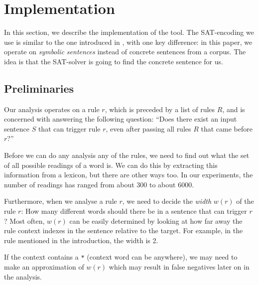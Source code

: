\section{Implementation}
\label{sec:implementation}

In this section, we describe the implementation of the tool.
The SAT-encoding we use is similar to the one introduced in , with one key difference: in this paper, we operate on {\em symbolic sentences} instead of concrete sentences from a corpus. The idea is that the SAT-solver is going to find the concrete sentence for us.

\subsection{Preliminaries}

Our analysis operates on a rule $r$, which is preceded by a list of rules $R$, and is concerned with answering the following question: ``Does there exist an input sentence $S$ that can trigger rule $r$, even after passing all rules $R$ that came before $r$?''

Before we can do any analysis any of the rules, we need to find out what the set of all possible readings of a word is. We can do this by extracting this information from a lexicon, but there are other ways too. In our experiments, the number of readings has ranged from about 300 to about 6000. 

Furthermore, when we analyse a rule $r$, we need to decide the {\em width} $w(r)$ of the rule $r$: How many different words should there be in a sentence that can trigger $r$? Most often, $w(r)$ can be easily determined by looking at how far away the rule context indexes in the sentence relative to the target. For example, in the rule mentioned in the introduction, the width is 2.

If the context contains a \verb!*! (context word can be anywhere),
we may need to make an approximation of $w(r)$ which may result in false negatives later on in the analysis.

